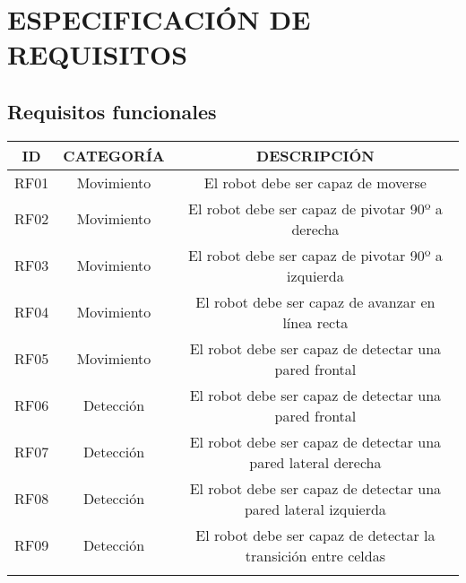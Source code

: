\chapter{ESPECIFICACIÓN DE REQUISITOS}

\vspace{-20pt}
\section{Requisitos funcionales}

\begin{center}
\begin{table}[h!]
  \begin{adjustbox}{max width=\textwidth}
  \begin{tabular}{|c|c|c|}
    \hline
    ID & CATEGORÍA & DESCRIPCIÓN \\ \hline
    \rowcolor{gray!20}

    RF01 & Movimiento & El robot debe ser capaz de moverse  \\ \hline
    \rowcolor{gray!20}

    RF02 & Movimiento & El robot debe ser capaz de pivotar 90º a derecha \\ \hline
    \rowcolor{gray!20}

    RF03 & Movimiento & El robot debe ser capaz de pivotar 90º a izquierda \\ \hline
    \rowcolor{gray!20}

    RF04 & Movimiento & El robot debe ser capaz de avanzar en línea recta \\ \hline
    \rowcolor{gray!20}

    RF05 & Movimiento & El robot debe ser capaz de detectar una pared frontal  \\ \hline
    \rowcolor{red!20}

    RF06 & Detección & El robot debe ser capaz de detectar una pared frontal    \\ \hline
    \rowcolor{red!20}

    RF07 & Detección & El robot debe ser capaz de detectar una pared lateral derecha \\ \hline
    \rowcolor{red!20}

    RF08 & Detección & El robot debe ser capaz de detectar una pared lateral izquierda \\ \hline
    \rowcolor{red!20}

    RF09 & Detección  & El robot debe ser capaz de detectar la transición entre celdas \\ \hline
    \rowcolor{red!20}


\end{tabular}
\end{adjustbox}
\end{table}
\end{center}
